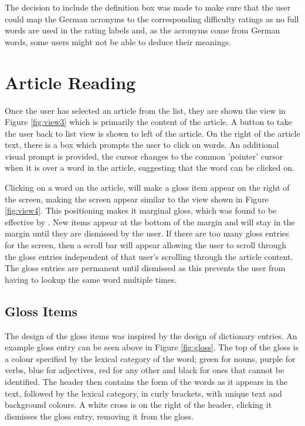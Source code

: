 The decision to include the definition box was made to make sure that the user could map the German acronyms to the corresponding difficulty ratings as no full words are used in the rating labels and, as the acronyms come from German words, some users might not be able to deduce their meanings.  

\section{Article Reading}

Once the user has selected an article from the list, they are shown the view in Figure \ref{fig:view3} which is primarily the content of the article. A button to take the user back to list view is shown to left of the article. On the right of the article text, there is a box which prompts the user to click on words. An additional visual prompt is provided, the cursor changes to the common 'pointer' cursor when it is over a word in the article, suggesting that the word can be clicked on.



Clicking on a word on the article, will make a gloss item appear on the right of the screen, making the screen appear similar to the view shown in Figure \ref{fig:view4}. This positioning makes it marginal gloss, which was found to be effective by \textcite{abuseileek2008}. New items appear at the bottom of the margin and will stay in the margin until they are dismissed by the user. If there are too many gloss entries for the screen, then a scroll bar will appear allowing the user to scroll through the gloss entries independent of that user's scrolling through the article content. The gloss entries are permanent until dismissed as this prevents the user from having to lookup the same word multiple times.


 
\subsection{Gloss Items}



The design of the gloss items was inspired by the design of dictionary entries. An example gloss entry can be seen above in Figure \ref{fig:gloss}. The top of the gloss is a colour specified by the lexical category of the word; green for nouns, purple for verbs, blue for adjectives, red for any other and black for ones that cannot be identified. The header then contains the form of the words as it appears in the text, followed by the lexical category, in curly brackets, with unique text and background colours. A white cross is on the right of the header, clicking it dismisses the gloss entry, removing it from the gloss. 

